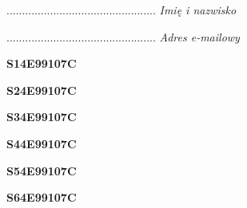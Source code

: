 \begin{turn}{90}\begin{minipage}{\linewidth} \vspace{20mm} ................................................  \textit{Imię i nazwisko}\end{minipage}\end{turn}

\begin{turn}{90}\begin{minipage}{\linewidth} \vspace{20mm} ................................................  \textit{Adres e-mailowy}\end{minipage}\end{turn}

\begin{turn}{90}\huge \begin{minipage}{\linewidth} \vspace{10mm}\textbf{S14E99107C}\end{minipage}\end{turn}

\begin{turn}{90}\huge \begin{minipage}{\linewidth} \vspace{10mm}\textbf{S24E99107C}\end{minipage}\end{turn}

\begin{turn}{90}\huge \begin{minipage}{\linewidth} \vspace{10mm}\textbf{S34E99107C}\end{minipage}\end{turn}

\begin{turn}{90}\huge \begin{minipage}{\linewidth} \vspace{10mm}\textbf{S44E99107C}\end{minipage}\end{turn}

\begin{turn}{90}\huge \begin{minipage}{\linewidth} \vspace{10mm}\textbf{S54E99107C}\end{minipage}\end{turn}

\begin{turn}{90}\huge \begin{minipage}{\linewidth} \vspace{10mm}\textbf{S64E99107C}\end{minipage}\end{turn}

